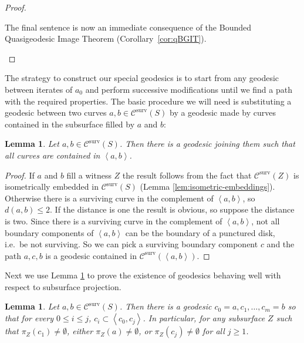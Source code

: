 \documentclass{amsart}
\newcommand{\C}{\mathcal{C}}
\newcommand{\dist}{d}
\newcommand{\Span}[1]{\left\langle #1\right\rangle}
\newcommand{\Csurv}{\C^{\text{surv}}}
\newtheorem{lemma}[thm]{Lemma}
\theoremstyle{definition}
\begin{document}
\begin{proof}
\begin{enumerate}
    The final sentence is now an immediate consequence of the Bounded
    Quasigeodesic Image Theorem (Corollary~\ref{cor:qBGIT}).
  \end{enumerate}
\end{proof}

The strategy to construct our special geodesics is to start from any geodesic between iterates of \(a_0\) and perform successive modifications until we find a path with the required properties. The basic procedure we will need is substituting a geodesic between two curves \(a,b\in\Csurv(S)\) by a geodesic made by curves contained in the subsurface filled by \(a\) and \(b\):

\begin{lemma}\label{lem:geodesic-in-span}
Let \(a,b\in\Csurv(S)\). Then there is a geodesic joining them such that all curves are contained in \(\Span{a,b}\).
\end{lemma}

\begin{proof}
If \(a\) and \(b\) fill a witness \(Z\) the result follows from the fact that \(\Csurv(Z)\) is isometrically embedded in \(\Csurv(S)\) (Lemma \ref{lem:isometric-embeddings}). Otherwise there is a surviving curve in the complement of \(\Span{a,b}\), so \(\dist(a,b)\leq 2\). If the distance is one the result is obvious, so suppose the distance is two.  Since there is a surviving curve in the complement of \(\Span{a,b}\), not all boundary components of \(\Span{a,b}\) can be the boundary of a punctured disk, i.e.\ be not surviving. So we can pick a surviving boundary component \(c\) and the path \(a,c,b\) is a geodesic contained in \(\Csurv(\Span{a,b})\).
\end{proof}

Next we use Lemma \ref{lem:geodesic-in-span} to prove the existence of geodesics behaving well with respect to subsurface projection.

\begin{lemma}\label{lem:replacement-scheme}
Let \(a,b\in \Csurv(S)\). Then there is a geodesic \(c_0=a,c_1,\dots,c_m=b\) so that for every \(0\leq i\leq j\), \(c_i\subset \Span{c_0,c_j}\). In particular, for any subsurface \(Z\) such that \(\pi_Z(c_1)\neq \emptyset\), either \(\pi_Z(a)\neq \emptyset\), or \(\pi_Z(c_j)\neq \emptyset\) for all \(j\geq 1\).
\end{lemma}
\end{document}

